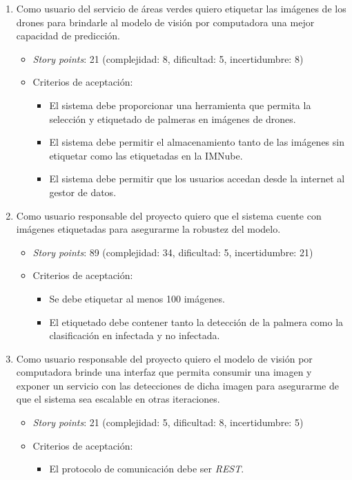 \documentclass[
11pt, %
]{charter}
\begin{document}
\begin{enumerate}
  \item Como usuario del servicio de áreas verdes quiero etiquetar las imágenes de los drones para brindarle al modelo de visión por computadora una mejor capacidad de predicción.
        \begin{itemize}
          \item \textit{Story points}: 21 (complejidad: 8, dificultad: 5, incertidumbre: 8)
          \item Criterios de aceptación:
                \begin{itemize}
                  \item El sistema debe proporcionar una herramienta que permita la selección y etiquetado de palmeras en imágenes de drones.
                  \item El sistema debe permitir el almacenamiento tanto de las imágenes sin etiquetar como las etiquetadas en la IMNube.
                  \item El sistema debe permitir que los usuarios accedan desde la internet al gestor de datos.
                \end{itemize}
        \end{itemize}

  \item Como usuario responsable del proyecto quiero que el sistema cuente con imágenes etiquetadas para asegurarme la robustez del modelo.
        \begin{itemize}
          \item \textit{Story points}: 89 (complejidad: 34, dificultad: 5, incertidumbre: 21)
          \item Criterios de aceptación:
                \begin{itemize}
                  \item Se debe etiquetar al menos 100 imágenes.
                  \item El etiquetado debe contener tanto la detección de la palmera como la clasificación en infectada y no infectada.
                \end{itemize}
        \end{itemize}

  \item Como usuario responsable del proyecto quiero el modelo de visión por computadora brinde una interfaz que permita consumir una imagen y exponer un servicio con las detecciones de dicha imagen para asegurarme de que el sistema sea escalable en otras iteraciones.
        \begin{itemize}
          \item \textit{Story points}: 21 (complejidad: 5, dificultad: 8, incertidumbre: 5)
          \item Criterios de aceptación:
                \begin{itemize}
                  \item El protocolo de comunicación debe ser \textit{REST}.
                \end{itemize}
        \end{itemize}


\end{enumerate}
\end{document}
